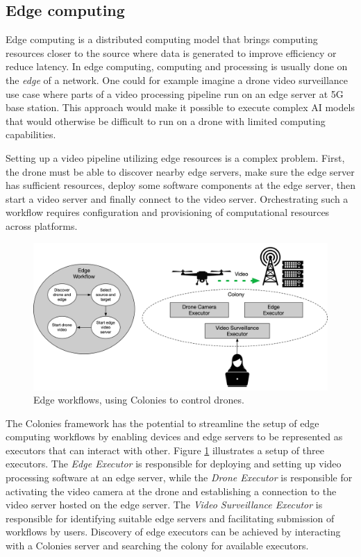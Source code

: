 \documentclass{article}
\begin{document}
\subsection{Edge computing}
Edge computing is a distributed computing model that brings computing resources closer to the source where data is generated to improve efficiency or reduce latency. In edge computing, computing and processing is usually done on the \emph{edge} of a network. One could for example imagine a drone video surveillance use case where parts of a video processing pipeline run on an edge server at 5G base station. This approach would make it possible to execute complex AI models that would otherwise be difficult to run on a drone with limited computing capabilities.

Setting up a video pipeline utilizing edge resources is a complex problem. First, the drone must be able to discover nearby edge servers, make sure the edge server has sufficient resources, deploy some software components at the edge server, then start a video server and finally connect to the video server. Orchestrating such a workflow requires configuration and provisioning of computational resources across platforms. 

\begin{figure}[h]
	\centering
    \includegraphics[scale=0.43]{edge.png}
	\caption{Edge workflows, using Colonies to control drones.}
	\label{fig:edge}
\end{figure}

The Colonies framework has the potential to streamline the setup of edge computing workflows by enabling devices and edge servers to be represented as executors that can interact with other. Figure \ref{fig:edge} illustrates a setup of three executors. The \emph{Edge Executor} is responsible for deploying and setting up video processing software at an edge server, while the \emph{Drone Executor} is responsible for activating the video camera at the drone and establishing a connection to the video server hosted on the edge server. The \emph{Video Surveillance Executor} is responsible for identifying suitable edge servers and facilitating submission of workflows by users. Discovery of edge executors can be achieved by interacting with a Colonies server and searching the colony for available executors.
\end{document}
